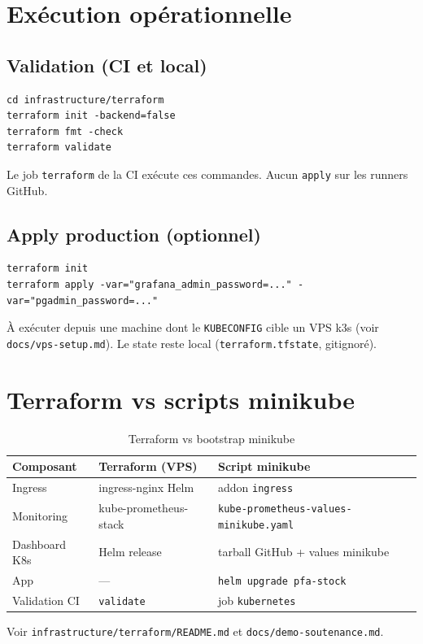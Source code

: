 \section{Exécution opérationnelle}

\subsection{Validation (CI et local)}

\begin{lstlisting}[style=bash]
cd infrastructure/terraform
terraform init -backend=false
terraform fmt -check
terraform validate
\end{lstlisting}

Le job \texttt{terraform} de la CI exécute ces commandes. Aucun \texttt{apply} sur les runners GitHub.

\subsection{Apply production (optionnel)}

\begin{lstlisting}[style=bash]
terraform init
terraform apply -var="grafana_admin_password=..." -var="pgadmin_password=..."
\end{lstlisting}

À exécuter depuis une machine dont le \texttt{KUBECONFIG} cible un VPS k3s (voir \texttt{docs/vps-setup.md}). Le state reste local (\texttt{terraform.tfstate}, gitignoré).

\section{Terraform vs scripts minikube}

\begin{table}[htbp]
  \centering
  \caption{Terraform vs bootstrap minikube}
  \label{tab:tf-vs-minikube}
  \begin{tabular}{@{}lll@{}}
    \toprule
    \textbf{Composant} & \textbf{Terraform (VPS)} & \textbf{Script minikube} \\
    \midrule
    Ingress & ingress-nginx Helm & addon \texttt{ingress} \\
    Monitoring & kube-prometheus-stack & \texttt{kube-prometheus-values-minikube.yaml} \\
    Dashboard K8s & Helm release & tarball GitHub + values minikube \\
    App & — & \texttt{helm upgrade pfa-stock} \\
    Validation CI & \texttt{validate} & job \texttt{kubernetes} \\
    \bottomrule
  \end{tabular}
\end{table}

Voir \texttt{infrastructure/terraform/README.md} et \texttt{docs/demo-soutenance.md}.
